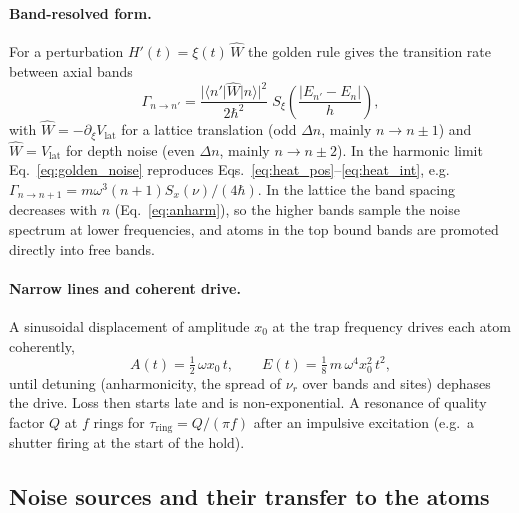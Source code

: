 \documentclass[11pt,a4paper]{article}
\begin{document}
\paragraph{Band-resolved form.} For a perturbation $H'(t)=\xi(t)\,\hat W$ the golden rule gives the transition rate between axial bands
\begin{equation}
\Gamma_{n\to n'}=\frac{|\langle n'|\hat W|n\rangle|^2}{2\hbar^2}\;S_\xi\!\left(\frac{|E_{n'}-E_n|}{h}\right),
\label{eq:golden_noise}
\end{equation}
with $\hat W=-\partial_\xi V_\mathrm{lat}$ for a lattice translation (odd $\Delta n$, mainly $n\to n\pm1$) and $\hat W=V_\mathrm{lat}$ for depth noise (even $\Delta n$, mainly $n\to n\pm2$). In the harmonic limit Eq.~\eqref{eq:golden_noise} reproduces Eqs.~\eqref{eq:heat_pos}--\eqref{eq:heat_int}, e.g.\ $\Gamma_{n\to n+1}=m\omega^3(n+1)S_x(\nu)/(4\hbar)$. In the lattice the band spacing decreases with $n$ (Eq.~\eqref{eq:anharm}), so the higher bands sample the noise spectrum at lower frequencies, and atoms in the top bound bands are promoted directly into free bands.

\paragraph{Narrow lines and coherent drive.} A sinusoidal displacement of amplitude $x_0$ at the trap frequency drives each atom coherently,
\begin{equation}
A(t)=\tfrac12\,\omega x_0\, t,\qquad E(t)=\tfrac18\,m\,\omega^4 x_0^2\,t^2 ,
\label{eq:coherent}
\end{equation}
until detuning (anharmonicity, the spread of $\nu_r$ over bands and sites) dephases the drive. Loss then starts late and is non-exponential. A resonance of quality factor $Q$ at $f$ rings for $\tau_\mathrm{ring}=Q/(\pi f)$ after an impulsive excitation (e.g.\ a shutter firing at the start of the hold).

\subsection{Noise sources and their transfer to the atoms}
\end{document}
